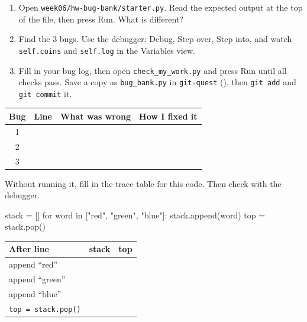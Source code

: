 \namedateline

\begin{core}
\begin{enumerate}[itemsep=2pt]
  \item Open \texttt{week06/hw-bug-bank/starter.py}. Read the expected output at the top of the file, then press Run. What is different?
  \item Find the 3 bugs. Use the debugger: Debug, Step over, Step into, and watch \texttt{self.coins} and \texttt{self.log} in the Variables view.
  \item Fill in your bug log, then open \texttt{check\_my\_work.py} and press Run until all checks pass. Save a copy as \texttt{bug\_bank.py} in \texttt{git-quest} (), then \texttt{git add} and \texttt{git commit} it.
\end{enumerate}
\begin{center}
\renewcommand{\arraystretch}{1.6}
\begin{tabular}{|c|p{1.4cm}|p{5.2cm}|p{5.2cm}|}
\hline
\textbf{Bug} & \textbf{Line} & \textbf{What was wrong} & \textbf{How I fixed it} \\ \hline
1 & & & \\ \hline
2 & & & \\ \hline
3 & & & \\ \hline
\end{tabular}
\end{center}
\end{core}

\begin{challenge}
Without running it, fill in the trace table for this code. Then check with the debugger.
\begin{pycode}
stack = []
for word in ["red", "green", "blue"]:
    stack.append(word)
top = stack.pop()
\end{pycode}
\begin{center}
\renewcommand{\arraystretch}{1.4}
\begin{tabular}{|p{3cm}|p{6cm}|p{3cm}|}
\hline
\textbf{After line} & \textbf{stack} & \textbf{top} \\ \hline
append \enquote{red} & & \\ \hline
append \enquote{green} & & \\ \hline
append \enquote{blue} & & \\ \hline
\texttt{top = stack.pop()} & & \\ \hline
\end{tabular}
\end{center}
\end{challenge}

